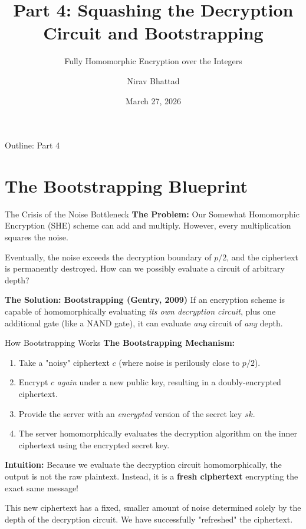 \documentclass[10pt, aspectratio=169]{beamer}
\title[Squashing \& Bootstrapping]{Part 4: Squashing the Decryption Circuit and Bootstrapping}
\subtitle{Fully Homomorphic Encryption over the Integers}
\author{Nirav Bhattad}
\date{March 27, 2026}
\begin{document}
\frame{\titlepage}

\begin{frame}{Outline: Part 4}
    \tableofcontents
\end{frame}

\section{The Bootstrapping Blueprint}
\begin{frame}{The Crisis of the Noise Bottleneck}
    \textbf{The Problem:}
    Our Somewhat Homomorphic Encryption (SHE) scheme can add and multiply. However, every multiplication squares the noise. 
    \pause
    
    \vspace{0.3cm}
    Eventually, the noise exceeds the decryption boundary of $p/2$, and the ciphertext is permanently destroyed. How can we possibly evaluate a circuit of arbitrary depth?
    \pause
    
    \vspace{0.3cm}
    \textbf{The Solution: Bootstrapping (Gentry, 2009)}
    If an encryption scheme is capable of homomorphically evaluating \textit{its own decryption circuit}, plus one additional gate (like a NAND gate), it can evaluate \textit{any} circuit of \textit{any} depth.
\end{frame}

\begin{frame}{How Bootstrapping Works}
    \textbf{The Bootstrapping Mechanism:}
    \begin{enumerate}
        \item Take a "noisy" ciphertext $c$ (where noise is perilously close to $p/2$).
        \item Encrypt $c$ \textit{again} under a new public key, resulting in a doubly-encrypted ciphertext.
        \item Provide the server with an \textit{encrypted} version of the secret key $sk$.
        \item The server homomorphically evaluates the decryption algorithm on the inner ciphertext using the encrypted secret key.
    \end{enumerate}
    \pause
    
    \vspace{0.3cm}
    \textbf{Intuition:} 
    Because we evaluate the decryption circuit homomorphically, the output is not the raw plaintext. Instead, it is a \textbf{fresh ciphertext} encrypting the exact same message! 
    
    This new ciphertext has a fixed, smaller amount of noise determined solely by the depth of the decryption circuit. We have successfully "refreshed" the ciphertext.
\end{frame}
\end{document}
